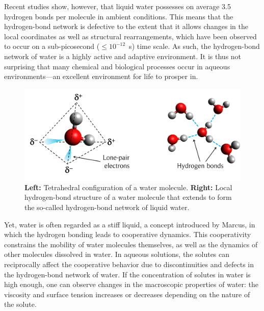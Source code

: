 Recent studies show, however, that liquid water possesses on average 3.5 hydrogen bonds per molecule in ambient conditions.\!\cite{Soper2000,Wernet2004,Kumar2007} This means that the hydrogen-bond network is defective to the extent that it allows changes in the local coordinates as well as structural rearrangements, which have been observed to occur on a sub-picosecond ($\leq$$10^{-12}$~s) time scale.\!\cite{Lawrence2003,Eaves2005,Fecko2005,Laage2006} As such, the hydrogen-bond network of water is a highly active and adaptive environment. It is thus not surprising that many chemical and biological processes occur in aqueous environments---an excellent environment for life to prosper in.\!\cite{Ball2008c,Bellissent-Funel2016,Ball2017}


\begin{figure}[t!]
	\centering
	\includegraphics[width=0.8\figwidth]{chapters/Chapter1_Introduction/Graphs/HydrogenBondsC.png} %
	\caption{\textbf{Left:} Tetrahedral configuration of a water molecule. \textbf{Right:} Local hydrogen-bond structure of a water molecule that extends to form the so-called hydrogen-bond network of liquid water. }
	\label{MoleculeHStructure}
\end{figure}



Yet, water is often regarded as a stiff liquid, a concept introduced by Marcus,\!\cite{Marcus2009,Marcus2010} in which the hydrogen bonding leads to cooperative dynamics. This cooperativity constrains the mobility of water molecules themselves, as well as the dynamics of other molecules dissolved in water. In aqueous solutions, the solutes can reciprocally affect the cooperative behavior due to discontinuities and defects in the hydrogen-bond network of water. If the concentration of solutes in water is high enough, one can observe changes in the macroscopic properties of water: the viscosity and surface tension increases or decreases depending on the nature of the solute.



